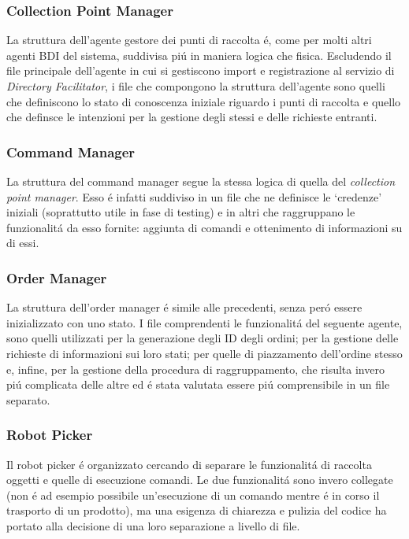 \subsubsection{Collection Point Manager}
La struttura dell'agente gestore dei punti di raccolta \'e, come per molti altri agenti BDI del sistema, suddivisa pi\'u in maniera logica che fisica. Escludendo il file principale dell'agente in cui si gestiscono import e registrazione al servizio di \textit{Directory Facilitator}, i file che compongono la struttura dell'agente sono quelli che definiscono lo stato di conoscenza iniziale riguardo i punti di raccolta e quello che definsce le intenzioni per la gestione degli stessi e delle richieste entranti.%

\subsubsection{Command Manager}
La struttura del command manager segue la stessa logica di quella del \textit{collection point manager}. Esso \'e infatti suddiviso in un file che ne definisce le `credenze' iniziali (soprattutto utile in fase di testing) e in altri che raggruppano le funzionalit\'a da esso fornite: aggiunta di comandi e ottenimento di informazioni su di essi.%

\subsubsection{Order Manager}
La struttura dell'order manager \'e simile alle precedenti, senza per\'o essere inizializzato con uno stato. I file comprendenti le funzionalit\'a del seguente agente, sono quelli utilizzati per la generazione degli ID degli ordini; per la gestione delle richieste di informazioni sui loro stati; per quelle di piazzamento dell'ordine stesso e, infine, per la gestione della procedura di raggruppamento, che risulta invero pi\'u complicata delle altre ed \'e stata valutata essere pi\'u comprensibile in un file separato.%

\subsubsection{Robot Picker}
Il robot picker \'e organizzato cercando di separare le funzionalit\'a di raccolta oggetti e quelle di esecuzione comandi. Le due funzionalit\'a sono invero collegate (non \'e ad esempio possibile un'esecuzione di un comando mentre \'e in corso il trasporto di un prodotto), ma una esigenza di chiarezza e pulizia del codice ha portato alla decisione di una loro separazione a livello di file.%

